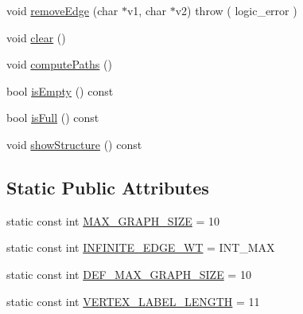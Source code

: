 \begin{DoxyCompactItemize}
\item 
void \hyperlink{class_weighted_graph_ad06596ac31405f02f39e482860ebe3a8}{remove\-Edge} (char $\ast$v1, char $\ast$v2)  throw ( logic\-\_\-error )
\item 
void \hyperlink{class_weighted_graph_a26890ebf74d23821a6e4dbcf803b5002}{clear} ()
\item 
void \hyperlink{class_weighted_graph_aeaea1bd5b1e14b69f2155613bfd25d68}{compute\-Paths} ()
\item 
bool \hyperlink{class_weighted_graph_a1c03a0f68447cf88fed97c2076501702}{is\-Empty} () const 
\item 
bool \hyperlink{class_weighted_graph_a22e56836e3967031a657cfa9ea5b9843}{is\-Full} () const 
\item 
void \hyperlink{class_weighted_graph_ad7f20a989073ea5401d504d944182347}{show\-Structure} () const 
\end{DoxyCompactItemize}
\subsection*{Static Public Attributes}
\begin{DoxyCompactItemize}
\item 
static const int \hyperlink{class_weighted_graph_af9b34017e5b494cd3aca2dbc8335fc3c}{M\-A\-X\-\_\-\-G\-R\-A\-P\-H\-\_\-\-S\-I\-Z\-E} = 10
\item 
static const int \hyperlink{class_weighted_graph_a5d4e3055fcccb2f50667bcd588dd8af7}{I\-N\-F\-I\-N\-I\-T\-E\-\_\-\-E\-D\-G\-E\-\_\-\-W\-T} = I\-N\-T\-\_\-\-M\-A\-X
\item 
static const int \hyperlink{class_weighted_graph_ab8b56b138f61133fe3833f96c318568e}{D\-E\-F\-\_\-\-M\-A\-X\-\_\-\-G\-R\-A\-P\-H\-\_\-\-S\-I\-Z\-E} = 10
\item 
static const int \hyperlink{class_weighted_graph_a19411776f4ee4e2a68bf2bc5e03aa10b}{V\-E\-R\-T\-E\-X\-\_\-\-L\-A\-B\-E\-L\-\_\-\-L\-E\-N\-G\-T\-H} = 11
\end{DoxyCompactItemize}



